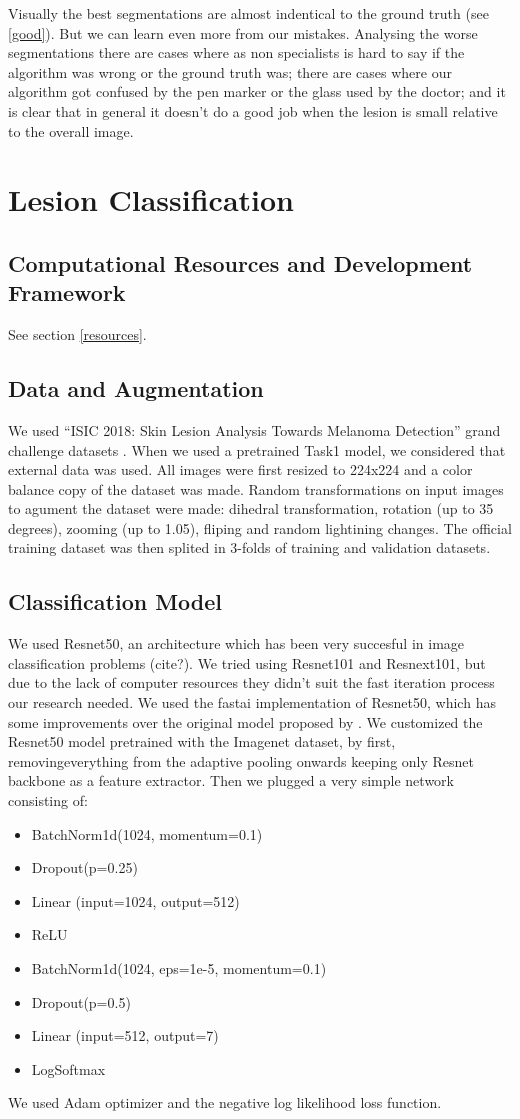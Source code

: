 \documentclass[conference]{IEEEtran}
\begin{document}
Visually the best segmentations are almost indentical to the ground truth (see \ref{good}). But we can learn even more from our mistakes. Analysing the worse segmentations there are cases where as non specialists is hard to say if the algorithm was wrong or the ground truth was; there are cases where our algorithm got confused by the pen marker or the glass used by the doctor; and it is clear that in general it doesn't do a good job when the lesion is small relative to the overall image. 

\section{Lesion Classification}
\label{classification}
\subsection{Computational Resources and Development Framework}
See section \ref{resources}.
\subsection{Data and Augmentation}
We used “ISIC 2018: Skin Lesion Analysis Towards Melanoma Detection” grand challenge datasets \cite{codella, ham}. When we used a pretrained Task1 model, we considered that external data was used. All images were first resized to 224x224 and a color balance copy of the dataset was made. Random transformations on input images to agument the dataset were made: dihedral transformation, rotation (up to 35 degrees), zooming (up to 1.05), fliping and random lightining changes. The official training dataset was then splited in 3-folds of training and validation datasets.  

\subsection{Classification Model}
We used Resnet50, an architecture which has been very succesful in image classification problems (cite?). We tried using Resnet101 and Resnext101, but due to the lack of computer resources they didn't suit the fast iteration process our research needed. We used the fastai implementation of Resnet50, which has some improvements over the original model proposed by \cite{resnet}. We customized the Resnet50 model pretrained with the Imagenet dataset, by first, removingeverything from the adaptive pooling onwards keeping only Resnet backbone as a feature extractor. Then we plugged a very simple network consisting of:
\begin{itemize}
\item BatchNorm1d(1024, momentum=0.1)
\item Dropout(p=0.25)
\item Linear (input=1024, output=512)
\item ReLU 
\item BatchNorm1d(1024, eps=1e-5, momentum=0.1)
\item Dropout(p=0.5)
\item Linear (input=512, output=7)
\item LogSoftmax
\end{itemize}
We used Adam optimizer and the negative log likelihood loss function.
\end{document}
